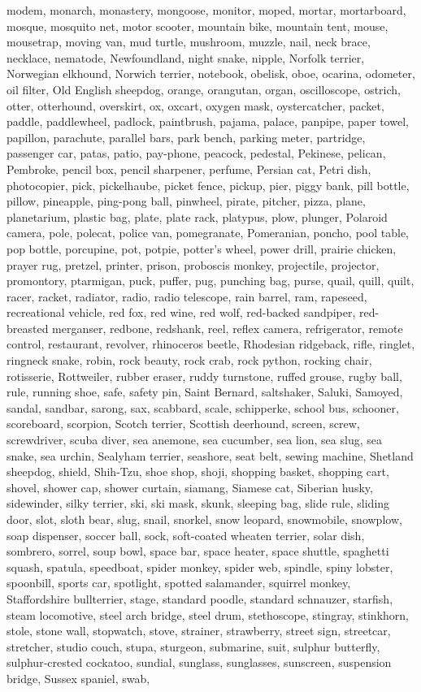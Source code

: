 modem, monarch, monastery, mongoose, monitor, moped, mortar, mortarboard, mosque, mosquito net, motor scooter, mountain bike, mountain tent, mouse, mousetrap, moving van, mud turtle, mushroom, muzzle, nail, neck brace, necklace, nematode, Newfoundland, night snake, nipple, Norfolk terrier, Norwegian elkhound, Norwich terrier, notebook, obelisk, oboe, ocarina, odometer, oil filter, Old English sheepdog, orange, orangutan, organ, oscilloscope, ostrich, otter, otterhound, overskirt, ox, oxcart, oxygen mask, oystercatcher, packet, paddle, paddlewheel, padlock, paintbrush, pajama, palace, panpipe, paper towel, papillon, parachute, parallel bars, park bench, parking meter, partridge, passenger car, patas, patio, pay-phone, peacock, pedestal, Pekinese, pelican, Pembroke, pencil box, pencil sharpener, perfume, Persian cat, Petri dish, photocopier, pick, pickelhaube, picket fence, pickup, pier, piggy bank, pill bottle, pillow, pineapple, ping-pong ball, pinwheel, pirate, pitcher, pizza, plane, planetarium, plastic bag, plate, plate rack, platypus, plow, plunger, Polaroid camera, pole, polecat, police van, pomegranate, Pomeranian, poncho, pool table, pop bottle, porcupine, pot, potpie, potter's wheel, power drill, prairie chicken, prayer rug, pretzel, printer, prison, proboscis monkey, projectile, projector, promontory, ptarmigan, puck, puffer, pug, punching bag, purse, quail, quill, quilt, racer, racket, radiator, radio, radio telescope, rain barrel, ram, rapeseed, recreational vehicle, red fox, red wine, red wolf, red-backed sandpiper, red-breasted merganser, redbone, redshank, reel, reflex camera, refrigerator, remote control, restaurant, revolver, rhinoceros beetle, Rhodesian ridgeback, rifle, ringlet, ringneck snake, robin, rock beauty, rock crab, rock python, rocking chair, rotisserie, Rottweiler, rubber eraser, ruddy turnstone, ruffed grouse, rugby ball, rule, running shoe, safe, safety pin, Saint Bernard, saltshaker, Saluki, Samoyed, sandal, sandbar, sarong, sax, scabbard, scale, schipperke, school bus, schooner, scoreboard, scorpion, Scotch terrier, Scottish deerhound, screen, screw, screwdriver, scuba diver, sea anemone, sea cucumber, sea lion, sea slug, sea snake, sea urchin, Sealyham terrier, seashore, seat belt, sewing machine, Shetland sheepdog, shield, Shih-Tzu, shoe shop, shoji, shopping basket, shopping cart, shovel, shower cap, shower curtain, siamang, Siamese cat, Siberian husky, sidewinder, silky terrier, ski, ski mask, skunk, sleeping bag, slide rule, sliding door, slot, sloth bear, slug, snail, snorkel, snow leopard, snowmobile, snowplow, soap dispenser, soccer ball, sock, soft-coated wheaten terrier, solar dish, sombrero, sorrel, soup bowl, space bar, space heater, space shuttle, spaghetti squash, spatula, speedboat, spider monkey, spider web, spindle, spiny lobster, spoonbill, sports car, spotlight, spotted salamander, squirrel monkey, Staffordshire bullterrier, stage, standard poodle, standard schnauzer, starfish, steam locomotive, steel arch bridge, steel drum, stethoscope, stingray, stinkhorn, stole, stone wall, stopwatch, stove, strainer, strawberry, street sign, streetcar, stretcher, studio couch, stupa, sturgeon, submarine, suit, sulphur butterfly, sulphur-crested cockatoo, sundial, sunglass, sunglasses, sunscreen, suspension bridge, Sussex spaniel, swab, 